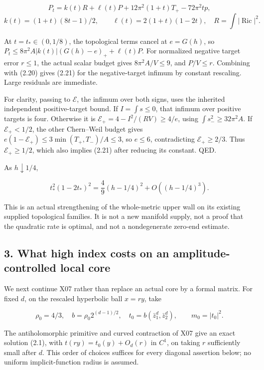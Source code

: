 \documentclass[
  10pt,
]{article}
\begin{document}
\[
 P_t=k(t)R+\ell(t)P+12\pi^2(1+t)T_+-72\pi^2tp,
\] \[
 k(t)=(1+t)(8t-1)/2,\qquad \ell(t)=2(1+t)(1-2t),
 \quad R=\int|\operatorname{Ric}|^2.
\]

At \(t=t_*\in(0,1/8)\), the topological terms cancel at \(e=G(h)\), so
\(P_t\le8\pi^2A|k(t)|(G(h)-e)_++\ell(t)P\). For normalized negative
target error \(r\le1\), the actual scalar budget gives
\(8\pi^2A/V\le9\), and \(P/V\le r\). Combining with (2.20) gives (2.21)
for the negative-target infimum by constant rescaling. Large residuals
are immediate.

For clarity, passing to \(\mathcal E\), the infimum over both signs,
uses the inherited independent positive-target bound. If
\(I=\int s\le0\), that infimum over positive targets is four. Otherwise
it is \(\mathcal E_+=4-I^2/(RV)\ge4/e\), using
\(\int s_-^2\ge32\pi^2A\). If \(\mathcal E_+<1/2\), the other
Chern--Weil budget gives \(e(1-\mathcal E_+)\le3\min(T_+,T_-)/A\le3\),
so \(e\le6\), contradicting \(\mathcal E_+\ge2/3\). Thus
\(\mathcal E_+\ge1/2\), which also implies (2.21) after reducing its
constant. QED.

As \(h\downarrow1/4\),

\[
 t_*^2(1-2t_*)^2=\frac49(h-1/4)^2+O((h-1/4)^3).
\]

This is an actual strengthening of the whole-metric upper wall on its
existing supplied topological families. It is not a new manifold supply,
not a proof that the quadratic rate is optimal, and not a nondegenerate
zero-end estimate.

\hypertarget{what-high-index-costs-on-an-amplitude-controlled-local-core}{%
\subsection{3. What high index costs on an amplitude-controlled local
core}\label{what-high-index-costs-on-an-amplitude-controlled-local-core}}

We next continue X07 rather than replace an actual core by a formal
matrix. For fixed \(d\), on the rescaled hyperbolic ball \(x=ry\), take

\[
 \rho_0=4/3,\quad b=\rho_0 2^{(d-1)/2},\quad
 t_0=b(\bar z_1^d,\bar z_2^d),\qquad
 m_0=|t_0|^2.
 \tag{3.1}
\]

The antiholomorphic primitive and curved contraction of X07 give an
exact solution (2.1), with \(t(ry)=t_0(y)+O_d(r)\) in \(C^1\), on taking
\(r\) sufficiently small after \(d\). This order of choices suffices for
every diagonal assertion below; no uniform implicit-function radius is
assumed.
\end{document}
